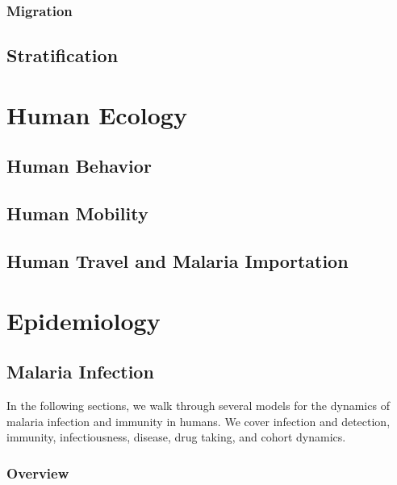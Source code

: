 \documentclass[
]{book}
\begin{document}
\hypertarget{migration-1}{%
\section{Migration}\label{migration-1}}

\hypertarget{stratification-1}{%
\chapter{Stratification}\label{stratification-1}}

\hypertarget{part-human-ecology}{%
\part{Human Ecology}\label{part-human-ecology}}

\hypertarget{human-behavior}{%
\chapter{Human Behavior}\label{human-behavior}}

\hypertarget{human-mobility}{%
\chapter{Human Mobility}\label{human-mobility}}

\hypertarget{human-travel-and-malaria-importation}{%
\chapter{Human Travel and Malaria Importation}\label{human-travel-and-malaria-importation}}

\hypertarget{part-epidemiology}{%
\part{Epidemiology}\label{part-epidemiology}}

\hypertarget{malaria-infection}{%
\chapter{Malaria Infection}\label{malaria-infection}}

In the following sections, we walk through several models for the dynamics of malaria infection and immunity in humans. We cover infection and detection, immunity, infectiousness, disease, drug taking, and cohort dynamics.

\hypertarget{overview-1}{%
\section{Overview}\label{overview-1}}
\end{document}
